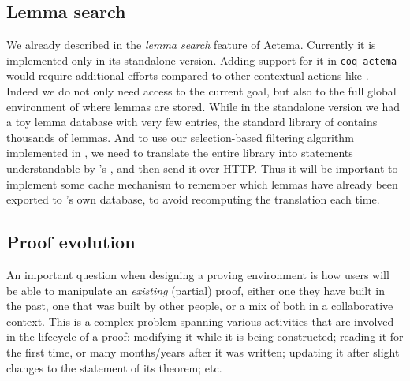 \subsection{Lemma search}

We already described in  the \emph{lemma search} feature of
Actema. Currently it is implemented only in its standalone version. Adding
support for it in \texttt{coq-actema} would require additional efforts compared
to other contextual actions like . Indeed we do not only need
access to the current goal, but also to the full global environment of  where
lemmas are stored. While in the standalone version we had a toy lemma database
with very few entries, the standard library of  contains thousands of lemmas.
And to use our selection-based filtering algorithm implemented in , we
need to translate the entire library into statements understandable by 's
, and then send it over HTTP. Thus it will be important to
implement some cache mechanism to remember which lemmas have already been
exported to 's own database, to avoid recomputing the translation each
time.



\subsection{Proof evolution}

\AP
An important question when designing a proving environment is how users will be
able to manipulate an \emph{existing} (partial) proof, either one they have
built in the past, one that was built by other people, or a mix of both in a
collaborative context. This is a complex problem spanning various activities
that are involved in the lifecycle of a proof: modifying it while it is being
constructed; reading it for the first time, or many months/years after it was
written; updating it after slight changes to the statement of its theorem;
etc.

